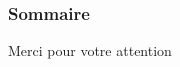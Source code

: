 \documentclass[xcolor=dvipsnames]{beamer} %
\begin{document}



\begin{frame}
  \scriptsize
  \frametitle{Sommaire}
  \tableofcontents
\end{frame}










\begin{frame}
  \large
  \centering
  Merci pour votre attention
\end{frame}

\appendix   %
\vspace*{0.5mm}
\printbibliography
\end{document}
